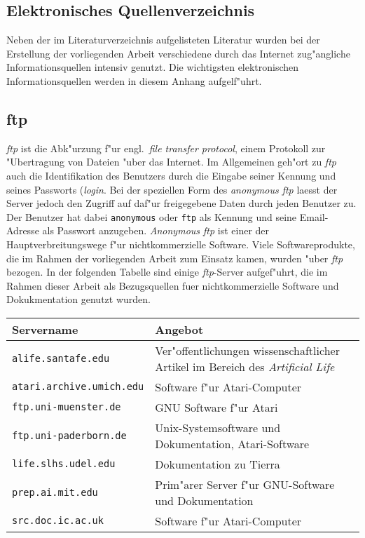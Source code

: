 \begin{appendix}


\chapter{Elektronisches Quellenverzeichnis}
\label{electronicsources}

Neben der im Literaturverzeichnis aufgelisteten Literatur wurden bei
der Erstellung der vorliegenden Arbeit verschiedene durch das
Internet zug"angliche Informationsquellen intensiv genutzt.
Die wichtigsten elektronischen Informationsquellen werden in diesem Anhang
aufgelf"uhrt.


\section {ftp}
\label{ftp-app}

{\slshape ftp} ist die Abk"urzung f"ur engl.\ {\slshape file transfer protocol}, einem
Protokoll zur "Ubertragung von Dateien "uber das Internet. Im Allgemeinen geh"ort zu {\slshape ftp}
auch die Identifikation des Benutzers durch die Eingabe seiner
Kennung und seines Passworts ({\slshape login}. Bei der speziellen Form des {\slshape anonymous ftp}
laesst der Server jedoch den Zugriff auf daf"ur freigegebene Daten durch
jeden Benutzer zu. Der Benutzer hat dabei \verb|anonymous| oder
\verb|ftp| als Kennung und seine Email-Adresse als Passwort anzugeben.
{\slshape Anonymous ftp} ist einer der Hauptverbreitungswege f"ur
nichtkommerzielle Software. Viele Softwareprodukte, die im Rahmen der
vorliegenden Arbeit zum Einsatz kamen, wurden "uber {\slshape ftp}
bezogen. In der folgenden Tabelle sind einige {\slshape ftp}-Server
aufgef"uhrt, die im Rahmen dieser Arbeit als Bezugsquellen fuer
nichtkommerzielle Software und Dokukmentation genutzt wurden.

\medskip
\noindent\begin{tabularx}{\linewidth}{|l|X|} \hline
Servername & Angebot \\ \hline
\verb|alife.santafe.edu|       & Ver"offentlichungen wissenschaftlicher Artikel im Bereich
                                 des {\slshape Artificial Life} \\
\verb|atari.archive.umich.edu| & Software f"ur Atari-Computer \\
\verb|ftp.uni-muenster.de|     & GNU Software f"ur Atari \\ 
\verb|ftp.uni-paderborn.de|    & Unix-Systemsoftware und Dokumentation, Atari-Software \\
\verb|life.slhs.udel.edu|      & Dokumentation zu Tierra \protect\cite{Ray92} \\
\verb|prep.ai.mit.edu|         & Prim"arer Server f"ur GNU-Software und Dokumentation \\
\verb|src.doc.ic.ac.uk|        & Software f"ur Atari-Computer \\ \hline
\end{tabularx}
\medskip



\end{appendix}
